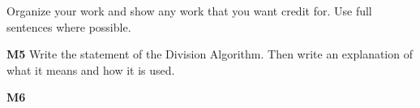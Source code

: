 \documentclass[addpoints]{exam}
\begin{document}
Organize your work and show any work that you want credit for. Use full sentences where possible.

\begin{questions}

\question \textbf{M5}
Write the statement of the Division Algorithm. Then write an explanation of what it means and how it is used. 


\question \textbf{M6}

\end{questions}
\end{document}
